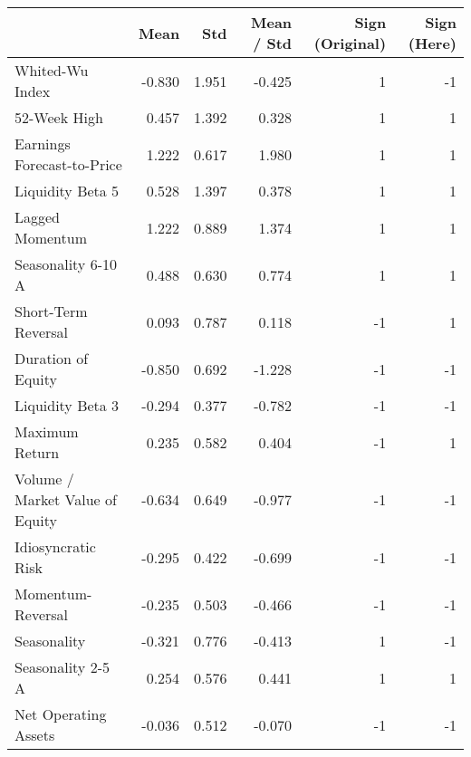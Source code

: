 \begin{tabular}{lrrrrr}
\toprule
{} &   Mean &    Std &  Mean / Std &  Sign (Original) &  Sign (Here) \\
\midrule
Whited-Wu Index                            & -0.830 &  1.951 &      -0.425 &                1 &           -1 \\
52-Week High                               &  0.457 &  1.392 &       0.328 &                1 &            1 \\
Earnings Forecast-to-Price                 &  1.222 &  0.617 &       1.980 &                1 &            1 \\
Liquidity Beta 5                           &  0.528 &  1.397 &       0.378 &                1 &            1 \\
Lagged Momentum                            &  1.222 &  0.889 &       1.374 &                1 &            1 \\
Seasonality 6-10 A                         &  0.488 &  0.630 &       0.774 &                1 &            1 \\
Short-Term Reversal                        &  0.093 &  0.787 &       0.118 &               -1 &            1 \\
Duration of Equity                         & -0.850 &  0.692 &      -1.228 &               -1 &           -1 \\
Liquidity Beta 3                           & -0.294 &  0.377 &      -0.782 &               -1 &           -1 \\
Maximum Return                             &  0.235 &  0.582 &       0.404 &               -1 &            1 \\
Volume / Market Value of Equity            & -0.634 &  0.649 &      -0.977 &               -1 &           -1 \\
Idiosyncratic Risk                         & -0.295 &  0.422 &      -0.699 &               -1 &           -1 \\
Momentum-Reversal                          & -0.235 &  0.503 &      -0.466 &               -1 &           -1 \\
Seasonality                                & -0.321 &  0.776 &      -0.413 &                1 &           -1 \\
Seasonality 2-5 A                          &  0.254 &  0.576 &       0.441 &                1 &            1 \\
Net Operating Assets                       & -0.036 &  0.512 &      -0.070 &               -1 &           -1 \\

\end{tabular}
